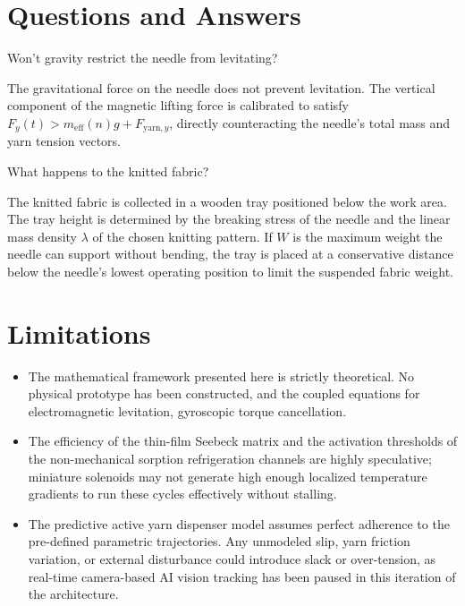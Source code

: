 \documentclass[10pt]{article}
\begin{document}
\section{Questions and Answers}
Won't gravity restrict the needle from levitating?

The gravitational force on the needle does not prevent levitation. The vertical component of the magnetic lifting force is calibrated to satisfy $F_y(t)>m_{\mathrm{eff}}(n)g+F_{\mathrm{yarn},y}$, directly counteracting the needle's total mass and yarn tension vectors.

What happens to the knitted fabric?

The knitted fabric is collected in a wooden tray positioned below the work area. The tray height is determined by the breaking stress of the needle and the linear mass density $\lambda$ of the chosen knitting pattern. If $W$ is the maximum weight the needle can support without bending, the tray is placed at a conservative distance below the needle's lowest operating position to limit the suspended fabric weight.

\section{Limitations}
\begin{itemize}
  \item The mathematical framework presented here is strictly theoretical. No physical prototype has been constructed, and the coupled equations for electromagnetic levitation, gyroscopic torque cancellation.
  \item The efficiency of the thin-film Seebeck matrix and the activation thresholds of the non-mechanical sorption refrigeration channels are highly speculative; miniature solenoids may not generate high enough localized temperature gradients to run these cycles effectively without stalling.
  \item The predictive active yarn dispenser model assumes perfect adherence to the pre-defined parametric trajectories. Any unmodeled slip, yarn friction variation, or external disturbance could introduce slack or over-tension, as real-time camera-based AI vision tracking has been paused in this iteration of the architecture.
\end{itemize}
\end{document}
